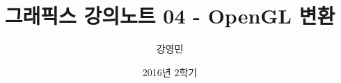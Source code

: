 \documentclass{beamer}
\title[3D 그래픽스 프로그래밍]{그래픽스 강의노트 04 - OpenGL 변환}
\author{강영민}
\institute{동명대학교}
\date{2016년 2학기}
\begin{document}
\begin{frame}
  \titlepage
\end{frame}




%
\end{document}
